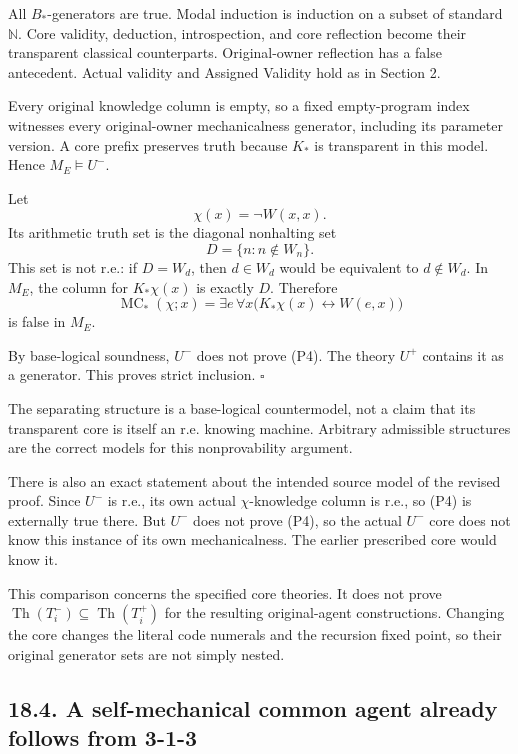\documentclass[
  11pt,
  letterpaper,
]{article}
\begin{document}
All \(B_*\)-generators are true. Modal induction is induction on a
subset of standard \(\mathbb N\). Core validity, deduction,
introspection, and core reflection become their transparent classical
counterparts. Original-owner reflection has a false antecedent. Actual
validity and Assigned Validity hold as in Section 2.

Every original knowledge column is empty, so a fixed empty-program index
witnesses every original-owner mechanicalness generator, including its
parameter version. A core prefix preserves truth because \(K_*\) is
transparent in this model. Hence \(M_E\models U^-\).

Let \[
\chi(x)=\neg W(x,x).
\] Its arithmetic truth set is the diagonal nonhalting set \[
D=\{n:n\notin W_n\}.
\] This set is not r.e.: if \(D=W_d\), then \(d\in W_d\) would be
equivalent to \(d\notin W_d\). In \(M_E\), the column for \(K_*\chi(x)\)
is exactly \(D\). Therefore \[
\operatorname{MC}_*(\chi;x)=
\exists e\,\forall x
 \bigl(K_*\chi(x)\leftrightarrow W(e,x)\bigr)
\tag{P4}
\] is false in \(M_E\).

By base-logical soundness, \(U^-\) does not prove (P4). The theory
\(U^+\) contains it as a generator. This proves strict inclusion.
\(\square\)

The separating structure is a base-logical countermodel, not a claim
that its transparent core is itself an r.e. knowing machine. Arbitrary
admissible structures are the correct models for this nonprovability
argument.

There is also an exact statement about the intended source model of the
revised proof. Since \(U^-\) is r.e., its own actual \(\chi\)-knowledge
column is r.e., so (P4) is externally true there. But \(U^-\) does not
prove (P4), so the actual \(U^-\) core does not know this instance of
its own mechanicalness. The earlier prescribed core would know it.

This comparison concerns the specified core theories. It does not prove
\(\operatorname{Th}(T_i^-)\subseteq\operatorname{Th}(T_i^+)\) for the
resulting original-agent constructions. Changing the core changes the
literal code numerals and the recursion fixed point, so their original
generator sets are not simply nested.

\subsection{18.4. A self-mechanical common agent already follows from
3-1-3}\label{a-self-mechanical-common-agent-already-follows-from-3-1-3}
\end{document}
